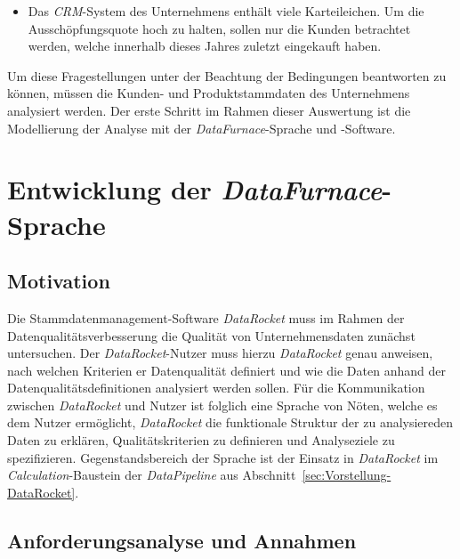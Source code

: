 \documentclass[
  language=german, %
  type=bachelor,%
  ngerman
]{isthesis}
\begin{document}
\begin{content}
\begin{itemize}
    \item Das \textit{CRM}-System des Unternehmens enthält viele Karteileichen.
      Um die Ausschöpfungsquote hoch zu halten, sollen nur die Kunden
      betrachtet werden, welche innerhalb dieses Jahres zuletzt eingekauft
      haben.

  \end{itemize}

  Um diese Fragestellungen unter der Beachtung der Bedingungen beantworten zu
  können, müssen die Kunden- und Produktstammdaten des Unternehmens analysiert
  werden. Der erste Schritt im Rahmen dieser Auswertung ist die Modellierung
  der Analyse \zB{} mit der \textit{DataFurnace}-Sprache und -Software.

  \chapter{Entwicklung der \textit{DataFurnace}-Sprache}\label{ch:entwicklung-datafurnace-sprache}



  \section{Motivation}

	Die Stammdatenmanagement-Software \textit{DataRocket} muss im Rahmen der
	Datenqualitätsver\-besserung die Qualität von Unternehmensdaten zunächst
	untersuchen. Der \textit{DataRocket}-Nutzer muss hierzu \textit{DataRocket}
	genau anweisen, nach welchen Kriterien er Datenqualität definiert und wie die
	Daten anhand der Datenqualitätsdefinitionen analysiert werden sollen. Für die
	Kommunikation zwischen \textit{DataRocket} und Nutzer ist folglich eine
	Sprache von Nöten, welche es dem Nutzer ermöglicht, \textit{DataRocket} die
	funktionale Struktur der zu analysiereden Daten zu erklären,
	Qualitätskriterien zu definieren und Analyseziele zu spezifizieren.
	Gegenstandsbe\-reich der Sprache ist der Einsatz in \textit{DataRocket} im
	\textit{Calculation}-Baustein der \textit{DataPipeline} aus
	Abschnitt~\ref{sec:Vorstellung-DataRocket}.


  \section{Anforderungsanalyse und Annahmen}\label{sec:sprache/anforderungsanalyse}


\end{content}
\end{document}
